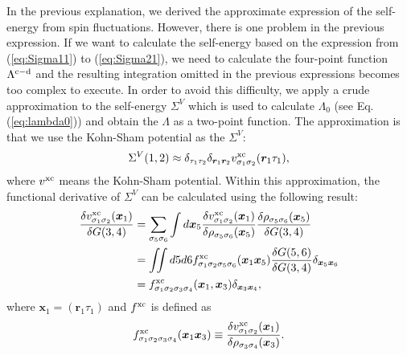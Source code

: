 In the previous explanation, we derived the approximate expression of the self-energy from spin fluctuations.
However, there is one problem in the previous expression.
If we want to calculate the self-energy based on the expression from (\ref{eq:Sigma11}) to (\ref{eq:Sigma21}), 
we need to calculate the four-point function $\Lambda^{\rm c - \rm d}$ and the resulting integration omitted in the previous expressions becomes 
too complex to execute.
In order to avoid this difficulty, we apply a crude approximation to the
self-energy $\Sigma^{V}$ which is used to calculate $\Lambda_0$ (see Eq.(\ref{eq:lambda0})) and obtain the $\Lambda$ as a two-point function.
The approximation is that we use the Kohn-Sham potential as the $\Sigma^{V}$\cite{Sole1994}:
%
\begin{equation}
	\Sigma^{V}(1,2) \approx \delta_{\tau_1\tau_2}\delta_{\bm r_1\bm r_2}
	v^{\rm xc}_{\sigma_1\sigma_2}(\bm r_1 \tau_1),
	\label{eq:localapp}
\end{equation}
%
where $v^{\rm xc}$ means the Kohn-Sham potential.
Within this approximation, the functional derivative of $\Sigma^{V}$
can be calculated using the following result:
%
\begin{equation}
\begin{split}
	\frac{\delta v^{\rm xc}_{\sigma_1\sigma_2}(\bm x_1)}{\delta G(3,4)}
	&= \sum_{\sigma_5\sigma_6} \int d{\bm x}_5 
	\frac{\delta v^{\rm xc}_{\sigma_1\sigma_2}(\bm x_1)}{\delta\rho_{\sigma_5\sigma_6}(\bm x_5)}
	\frac{\delta\rho_{\sigma_5\sigma_6}(\bm x_5)}{\delta G(3,4)} \\
	&= \iint d5d6 f^{\rm xc}_{\sigma_1\sigma_2\sigma_5\sigma_6}(\bm x_1 \bm x_5)
	\frac{\delta G(5,6)}{\delta G(3,4)}\delta_{\bm x_5\bm x_6} \\
	&= f^{\rm xc}_{\sigma_1\sigma_2\sigma_3\sigma_4}(\bm x_1, \bm x_3)\delta_{\bm x_3 \bm x_4},
	\label{eq:dervxc}
\end{split}
\end{equation}
%
where $\bm x_1 = (\bm r_1 \tau_1)$ and $f^{\rm xc}$ is defined as
%
\begin{equation}
	f^{\rm xc}_{\sigma_1\sigma_2\sigma_3\sigma_4}(\bm x_1 \bm x_3)
	\equiv 
	\frac{\delta v^{\rm xc}_{\sigma_1\sigma_2}(\bm x_1)}{\delta\rho_{\sigma_3\sigma_4}(\bm x_3)}.
	\label{eq:deffxc}
\end{equation}
%

